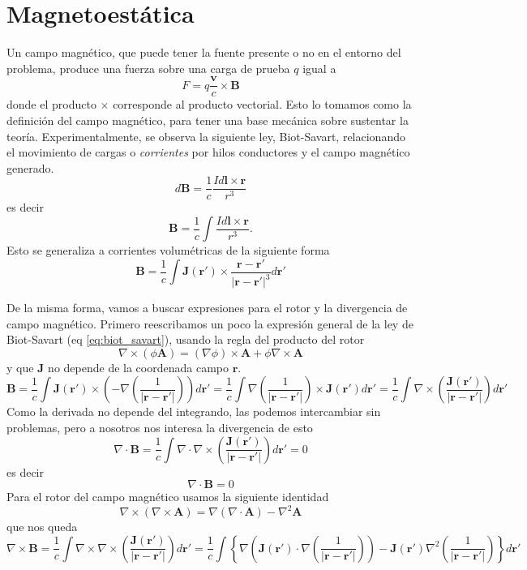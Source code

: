 \documentclass[a4paper]{article}
\numberwithin{equation}{section} %
\renewcommand{\vec}[1]{\boldsymbol{#1}}
\newcommand{\rinv}{\frac{1}{|\vec{r} - \vec{r}'|}}
\newcommand{\Rinv}{\frac{\vec{r} - \vec{r}'}{|\vec{r} - \vec{r}'|^3}}
\begin{document}
\section{Magnetoestática}
Un campo magnético, que puede tener la fuente presente o no en el entorno del problema, produce una fuerza sobre una carga de prueba $q$ igual a
\begin{equation}
F = q \frac{\vec{v}}{c} \times \vec{B}
\end{equation}
donde el producto $\times$ corresponde al producto vectorial. Esto lo tomamos como la definición del campo magnético, para tener una base mecánica sobre sustentar la teoría.
Experimentalmente, se observa la siguiente ley, Biot-Savart, relacionando el movimiento de cargas o \emph{corrientes} por hilos conductores y el campo magnético generado.
\begin{equation}
 d\vec{B} = \frac{1}{c} \frac{I d\vec{l} \times \vec{r}}{r^3}
\end{equation}
es decir
\begin{equation}
    \vec{B} = \frac{1}{c} \int  \frac{I d\vec{l} \times \vec{r}}{r^3}.
\end{equation}
Esto se generaliza a corrientes volumétricas de la siguiente forma
\begin{equation}
    \vec{B} = \frac{1}{c} \int  \vec{J}(\vec{r}') \times \Rinv d\vec{r}'
    \label{eq:biot_savart}
\end{equation}

De la misma forma, vamos a buscar expresiones para el rotor y la divergencia de campo magnético. Primero reescribamos un poco la expresión general de la ley de Biot-Savart (eq \ref{eq:biot_savart}), usando la regla del producto del rotor
\[ \nabla \times (\phi \vec{A}) = (\nabla \phi) \times \vec{A} + \phi \nabla \times \vec{A} \]
y que $\vec{J}$ no depende de la coordenada campo $\vec{r}$.
\[ \vec{B} = \frac{1}{c} \int  \vec{J}(\vec{r}') \times \left(- \nabla\left(\rinv\right) \right) d\vec{r}' = \frac{1}{c} \int  \nabla\left(\rinv\right) \times \vec{J}(\vec{r}') d\vec{r}' = \frac{1}{c} \int \nabla \times \left( \frac{\vec{J}(\vec{r}')}{|\vec{r} - \vec{r}'|}\right) d\vec{r}'\]
Como la derivada no depende del integrando, las podemos intercambiar sin problemas, pero a nosotros nos interesa la divergencia de esto
\[ \nabla \cdot \vec{B} = \frac{1}{c} \int  \nabla \cdot \nabla \times \left( \frac{\vec{J}(\vec{r}')}{|\vec{r} - \vec{r}'|}\right) d\vec{r}' = 0\]
es decir
\begin{equation}
    \nabla \cdot \vec{B} = 0
    \label{eq:gauss_magnetic}
\end{equation}
Para el rotor del campo magnético usamos la siguiente identidad
\begin{equation}
\nabla \times \left( \nabla \times \vec{A} \right) = \nabla(\nabla \cdot \vec{A}) - \nabla^{2}\vec{A}
\end{equation}
que nos queda
\[ \nabla \times \vec{B} = \frac{1}{c} \int  \nabla \times \nabla \times \left( \frac{\vec{J}(\vec{r}')}{|\vec{r} - \vec{r}'|}\right) d\vec{r}' = \frac{1}{c} \int \left\{ \nabla  \left(\vec{J}(\vec{r}') \cdot \nabla \left( \rinv \right) \right) - \vec{J}(\vec{r}') \nabla^2 \left( \rinv \right) \right\} d\vec{r}' \]
\end{document}
